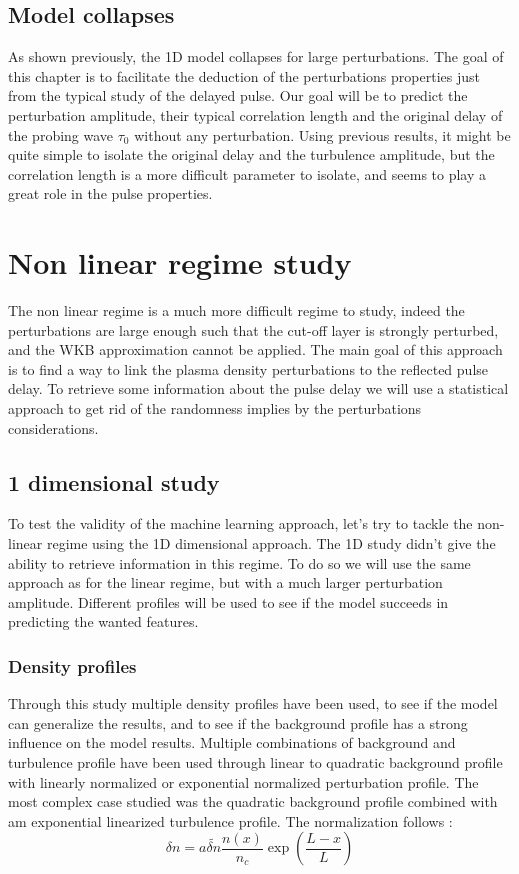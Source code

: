 \documentclass[11pt,a4paper]{report}
\begin{document}
\begin{multicols}{2}

    \section{Model collapses}

    As shown previously, the 1D model collapses for large perturbations. The goal of this chapter is to facilitate the deduction of the perturbations properties just from the typical study of the delayed pulse.
    Our goal will be to predict the perturbation amplitude, their typical correlation length and the original delay of the probing wave $\tau_0$ without any perturbation. Using previous results, it might be quite simple to isolate the original delay and the turbulence amplitude, but the correlation length is a more difficult parameter to isolate, and seems to play a great role in the pulse properties.

    \chapter{Non linear regime study}
    The non linear regime is a much more difficult regime to study, indeed the perturbations are large enough such that the cut-off layer is strongly perturbed, and the WKB approximation cannot be applied. The main goal of this approach is to find a way to link the plasma density perturbations to the reflected pulse delay. To retrieve some information about the pulse delay we will use a statistical approach to get rid of the randomness implies by the perturbations considerations.

    \section{1 dimensional study}
    To test the validity of the machine learning approach, let's try to tackle the non-linear regime using the 1D dimensional approach. The 1D study didn't give the ability to retrieve information in this regime.
    To do so we will use the same approach as for the linear regime, but with a much larger perturbation amplitude. Different profiles will be used to see if the model succeeds in predicting the wanted features.

    \subsection{Density profiles}
    Through this study multiple density profiles have been used, to see if the model can generalize the results, and to see if the background profile has a strong influence on the model results. Multiple combinations of background and turbulence profile have been used through linear to quadratic background profile with linearly normalized or exponential normalized perturbation profile.
    The most complex case studied was the quadratic background profile combined with am exponential linearized turbulence profile.
    The normalization follows : $$\delta n = a\tilde{\delta n}\frac{n(x)}{n_c} \exp(\frac{L-x}{L}) $$


\end{multicols}
\end{document}
